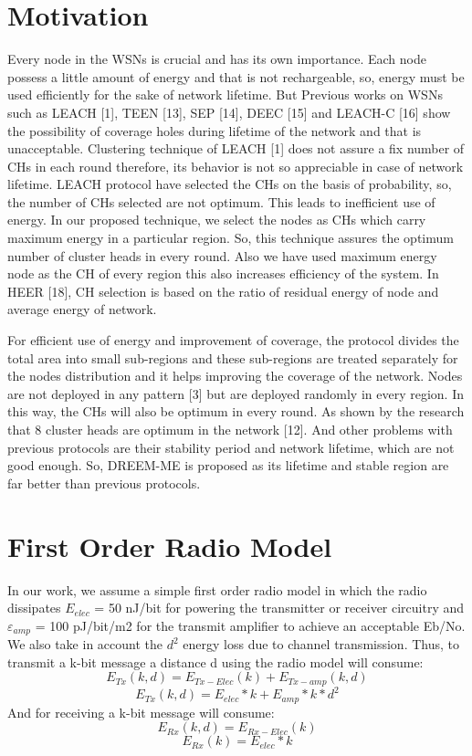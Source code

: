 \documentclass[journal]{IEEEtran}
\begin{document}
\section{Motivation}
Every node in the WSNs is crucial and has its own importance. Each node possess a little amount of energy and that is not rechargeable, so, energy must be used efficiently for the sake of network lifetime. But Previous works on WSNs such as LEACH [1], TEEN [13], SEP [14], DEEC [15] and LEACH-C [16] show the possibility of coverage holes during lifetime of the network and that is unacceptable. Clustering technique of LEACH [1] does not assure a fix number of CHs in each round therefore, its behavior is not so appreciable in case of network lifetime. LEACH protocol have selected the CHs on the basis of probability, so, the number of CHs selected are not optimum. This leads to inefficient use of energy. In our proposed technique, we select the nodes as CHs which carry maximum energy in a particular region. So, this technique assures the optimum number of cluster heads in every round. Also we have used maximum energy node as the CH of every region this also increases efficiency of the system. In HEER [18], CH selection is based on the ratio of residual energy of node and average energy of network.

For efficient use of energy and improvement of coverage, the protocol divides the total area into small sub-regions and these sub-regions are treated separately for the nodes distribution and it helps improving the coverage of the network. Nodes are not deployed in any pattern [3] but are deployed randomly in every region. In this way, the CHs will also be optimum in every round. As shown by the research that 8 cluster heads are optimum in the network [12]. And other problems with previous protocols are their stability period and network lifetime, which are not good enough. So, DREEM-ME is proposed as its lifetime and stable region are far better than previous protocols.

\section{First Order Radio Model}
 In our work, we assume a simple first order radio model in which the radio dissipates $E_{elec}$ = 50 nJ/bit for powering the transmitter or receiver circuitry and $\varepsilon_{amp}$ = 100 pJ/bit/m2 for the transmit amplifier to achieve an acceptable Eb/No. We also take in account the $d^2$ energy loss due to channel transmission. Thus, to transmit a k-bit message a distance d using the radio model will consume:
\begin{equation}
  E_{Tx}(k,d)=E_{Tx-Elec}(k)+E_{Tx-amp}(k,d)
\end{equation}
\begin{equation}
  E_{Tx}(k,d)=E_{elec} * k + E_{amp}*k*d^2
\end{equation}
 And for receiving a k-bit message will consume:
\begin{equation}
  E_{Rx}(k,d)=E_{Rx-Elec}(k)
\end{equation}
\begin{equation}
  E_{Rx}(k)=E_{elec} * k
\end{equation}
\end{document}
